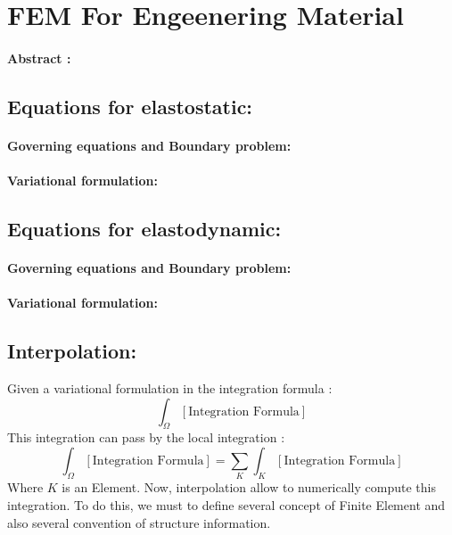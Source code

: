 \documentclass[a4paper,10pt]{article}
\begin{document}
\section{FEM For Engeenering Material}

\paragraph{Abstract : }

\subsection{Equations for elastostatic: } 

\paragraph{Governing equations and Boundary problem: }
\paragraph{Variational formulation: }

\subsection{Equations for elastodynamic: }

\paragraph{Governing equations and Boundary problem: }
\paragraph{Variational formulation: }

\subsection{Interpolation: } 
Given a variational formulation in the integration formula :
\[
 \int_{\Omega} \left[\text{Integration Formula} \right]
\]
This integration can pass by the local integration :
\[
 \int_{\Omega} \left[\text{Integration Formula} \right] =\sum_{K} \int_{K} \left[\text{Integration Formula} \right] 
\]
Where $K$ is an Element. Now, interpolation allow to numerically compute this integration. To do this, we must to define several concept of Finite Element and also several convention of structure information. 
\end{document}
